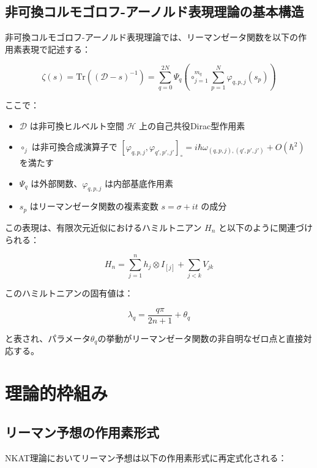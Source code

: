 \documentclass[12pt]{article}
\begin{document}
\subsection{非可換コルモゴロフ-アーノルド表現理論の基本構造}

非可換コルモゴロフ-アーノルド表現理論では、リーマンゼータ関数を以下の作用素表現で記述する：

\begin{equation}
\zeta(s) = \text{Tr}((\mathcal{D} - s)^{-1}) = \sum_{q=0}^{2N} \Psi_q\left(\circ_{j=1}^{m_q} \sum_{p=1}^N \varphi_{q,p,j}(s_p)\right)
\end{equation}

ここで：
\begin{itemize}
\item $\mathcal{D}$ は非可換ヒルベルト空間 $\mathcal{H}$ 上の自己共役Dirac型作用素
\item $\circ_j$ は非可換合成演算子で $[\varphi_{q,p,j}, \varphi_{q',p',j'}]_\circ = i\hbar\omega_{(q,p,j),(q',p',j')} + O(\hbar^2)$ を満たす
\item $\Psi_q$ は外部関数、$\varphi_{q,p,j}$ は内部基底作用素
\item $s_p$ はリーマンゼータ関数の複素変数 $s = \sigma + it$ の成分
\end{itemize}

この表現は、有限次元近似におけるハミルトニアン $H_n$ と以下のように関連づけられる：

\begin{equation}
H_n = \sum_{j=1}^n h_j \otimes I_{[j]} + \sum_{j<k} V_{jk}
\end{equation}

このハミルトニアンの固有値は：

\begin{equation}
\lambda_q = \frac{q\pi}{2n+1} + \theta_q
\end{equation}

と表され、パラメータ$\theta_q$の挙動がリーマンゼータ関数の非自明なゼロ点と直接対応する。

\section{理論的枠組み}

\subsection{リーマン予想の作用素形式}

NKAT理論においてリーマン予想は以下の作用素形式に再定式化される：
\end{document}
